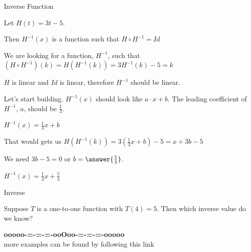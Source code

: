 \documentclass{ximera}
\begin{document}
\begin{example} Inverse Function


Let $H(t) = 3t - 5$. 

Then $H^{-1}(x)$ is a function such that $H \circ H^{-1} = Id$ 


We are looking for a function, $H^{-1}$, such that $(H \circ H^{-1})(k) = H(H^{-1}(k)) = 3 H^{-1}(k) - 5 = k$ 



$H$ is linear and $Id$ is linear, therefore $H^{-1}$ should be linear.

Let's start building.  $H^{-1}(x)$ should look like $a \cdot x + b$.  The leading coefficient of $H^{-1}$, $a$, should be $\frac{1}{3}$.


$H^{-1}(x) =\frac{1}{3} x + b$


That would gets us $H(H^{-1}(k)) = 3 (\frac{1}{3}x + b) - 5 = x + 3b - 5 $


We need $3b - 5 = 0$ or $b = \answer{\frac{5}{3}}$.


$H^{-1}(x) =\frac{1}{3} x + \frac{5}{3}$



\end{example}




\begin{question} Inverse


Suppose $T$ is a one-to-one function with $T(4) = 5$. Then which inverse value do we know?


\begin{multipleChoice}
\end{multipleChoice}

\end{question}






















\begin{center}
\textbf{\textcolor{green!50!black}{ooooo-=-=-=-ooOoo-=-=-=-ooooo}} \\

more examples can be found by following this link\\ 

\end{center}
\end{document}
